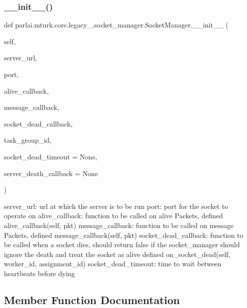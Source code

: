 \subsubsection{\texorpdfstring{\+\_\+\+\_\+init\+\_\+\+\_\+()}{\_\_init\_\_()}}
{\footnotesize\ttfamily def parlai.\+mturk.\+core.\+legacy\+\_.\+socket\+\_\+manager.\+Socket\+Manager.\+\_\+\+\_\+init\+\_\+\+\_\+ (\begin{DoxyParamCaption}\item[{}]{self,  }\item[{}]{server\+\_\+url,  }\item[{}]{port,  }\item[{}]{alive\+\_\+callback,  }\item[{}]{message\+\_\+callback,  }\item[{}]{socket\+\_\+dead\+\_\+callback,  }\item[{}]{task\+\_\+group\+\_\+id,  }\item[{}]{socket\+\_\+dead\+\_\+timeout = {\ttfamily None},  }\item[{}]{server\+\_\+death\+\_\+callback = {\ttfamily None} }\end{DoxyParamCaption})}

\begin{DoxyVerb}server_url:           url at which the server is to be run
port:                 port for the socket to operate on
alive_callback:       function to be called on alive Packets, defined
               alive_callback(self, pkt)
message_callback:     function to be called on message Packets, defined
               message_callback(self, pkt)
socket_dead_callback: function to be called when a socket dies, should
              return false if the socket_manager should ignore
              the death and treat the socket as alive defined
               on_socket_dead(self, worker_id, assignment_id)
socket_dead_timeout:  time to wait between heartbeats before dying
\end{DoxyVerb}
 

\subsection{Member Function Documentation}
\mbox{\label{classparlai_1_1mturk_1_1core_1_1legacy__2018_1_1socket__manager_1_1SocketManager_a762590d50448509a5986c27a60dfea1a}} 
